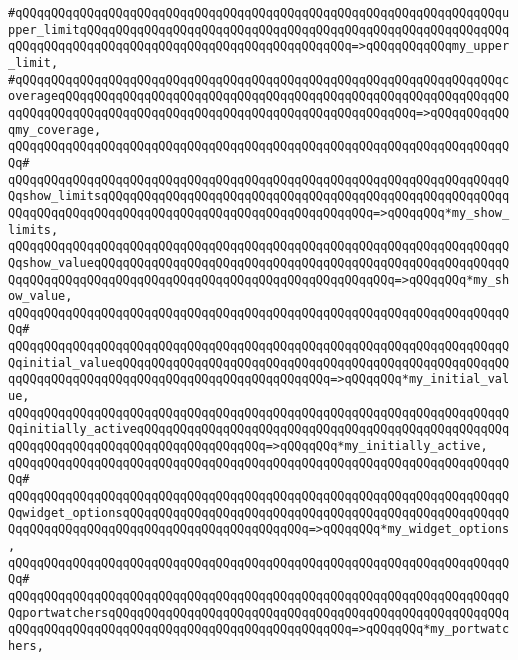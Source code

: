 \verb|#qQQqqQQqqQQqqQQqqQQqqQQqqQQqqQQqqQQqqQQqqQQqqQQqqQQqqQQqqQQqqQQqqQQqupper_limitqQQqqQQqqQQqqQQqqQQqqQQqqQQqqQQqqQQqqQQqqQQqqQQqqQQqqQQqqQQqqQQqqQQqqQQqqQQqqQQqqQQqqQQqqQQqqQQqqQQqqQQqqQQq=>qQQqqQQqqQQqmy_upper_limit,|\newline
\verb|#qQQqqQQqqQQqqQQqqQQqqQQqqQQqqQQqqQQqqQQqqQQqqQQqqQQqqQQqqQQqqQQqqQQqcoverageqQQqqQQqqQQqqQQqqQQqqQQqqQQqqQQqqQQqqQQqqQQqqQQqqQQqqQQqqQQqqQQqqQQqqQQqqQQqqQQqqQQqqQQqqQQqqQQqqQQqqQQqqQQqqQQqqQQqqQQq=>qQQqqQQqqQQqmy_coverage,|\newline
\verb|qQQqqQQqqQQqqQQqqQQqqQQqqQQqqQQqqQQqqQQqqQQqqQQqqQQqqQQqqQQqqQQqqQQqqQQq#|\newline
\verb|qQQqqQQqqQQqqQQqqQQqqQQqqQQqqQQqqQQqqQQqqQQqqQQqqQQqqQQqqQQqqQQqqQQqqQQqshow_limitsqQQqqQQqqQQqqQQqqQQqqQQqqQQqqQQqqQQqqQQqqQQqqQQqqQQqqQQqqQQqqQQqqQQqqQQqqQQqqQQqqQQqqQQqqQQqqQQqqQQqqQQqqQQq=>qQQqqQQq*my_show_limits,|\newline
\verb|qQQqqQQqqQQqqQQqqQQqqQQqqQQqqQQqqQQqqQQqqQQqqQQqqQQqqQQqqQQqqQQqqQQqqQQqshow_valueqQQqqQQqqQQqqQQqqQQqqQQqqQQqqQQqqQQqqQQqqQQqqQQqqQQqqQQqqQQqqQQqqQQqqQQqqQQqqQQqqQQqqQQqqQQqqQQqqQQqqQQqqQQqqQQq=>qQQqqQQq*my_show_value,|\newline
\verb|qQQqqQQqqQQqqQQqqQQqqQQqqQQqqQQqqQQqqQQqqQQqqQQqqQQqqQQqqQQqqQQqqQQqqQQq#|\newline
\verb|qQQqqQQqqQQqqQQqqQQqqQQqqQQqqQQqqQQqqQQqqQQqqQQqqQQqqQQqqQQqqQQqqQQqqQQqinitial_valueqQQqqQQqqQQqqQQqqQQqqQQqqQQqqQQqqQQqqQQqqQQqqQQqqQQqqQQqqQQqqQQqqQQqqQQqqQQqqQQqqQQqqQQqqQQqqQQqqQQq=>qQQqqQQq*my_initial_value,|\newline
\verb|qQQqqQQqqQQqqQQqqQQqqQQqqQQqqQQqqQQqqQQqqQQqqQQqqQQqqQQqqQQqqQQqqQQqqQQqinitially_activeqQQqqQQqqQQqqQQqqQQqqQQqqQQqqQQqqQQqqQQqqQQqqQQqqQQqqQQqqQQqqQQqqQQqqQQqqQQqqQQqqQQqqQQq=>qQQqqQQq*my_initially_active,|\newline
\verb|qQQqqQQqqQQqqQQqqQQqqQQqqQQqqQQqqQQqqQQqqQQqqQQqqQQqqQQqqQQqqQQqqQQqqQQq#|\newline
\verb|qQQqqQQqqQQqqQQqqQQqqQQqqQQqqQQqqQQqqQQqqQQqqQQqqQQqqQQqqQQqqQQqqQQqqQQqwidget_optionsqQQqqQQqqQQqqQQqqQQqqQQqqQQqqQQqqQQqqQQqqQQqqQQqqQQqqQQqqQQqqQQqqQQqqQQqqQQqqQQqqQQqqQQqqQQqqQQq=>qQQqqQQq*my_widget_options,|\newline
\verb|qQQqqQQqqQQqqQQqqQQqqQQqqQQqqQQqqQQqqQQqqQQqqQQqqQQqqQQqqQQqqQQqqQQqqQQq#|\newline
\verb|qQQqqQQqqQQqqQQqqQQqqQQqqQQqqQQqqQQqqQQqqQQqqQQqqQQqqQQqqQQqqQQqqQQqqQQqportwatchersqQQqqQQqqQQqqQQqqQQqqQQqqQQqqQQqqQQqqQQqqQQqqQQqqQQqqQQqqQQqqQQqqQQqqQQqqQQqqQQqqQQqqQQqqQQqqQQqqQQqqQQq=>qQQqqQQq*my_portwatchers,|\newline
